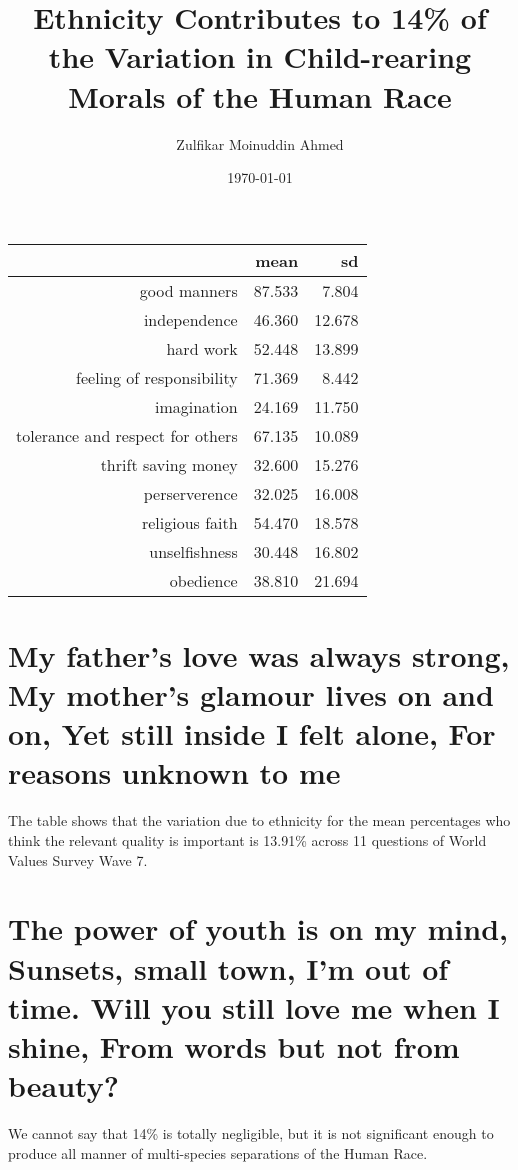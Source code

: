 \documentclass{amsart}
\title{Ethnicity Contributes to 14\% of the Variation in Child-rearing Morals of the Human Race}
\author{Zulfikar Moinuddin Ahmed}
\date{\today}
\begin{document}
\maketitle


\begin{table}[ht]
\centering
\begin{tabular}{rrr}
  \hline
 & mean & sd \\ 
  \hline
good manners & 87.533 & 7.804 \\ 
  independence & 46.360 & 12.678 \\ 
  hard work & 52.448 & 13.899 \\ 
  feeling of responsibility & 71.369 & 8.442 \\ 
  imagination & 24.169 & 11.750 \\ 
  tolerance and respect for others & 67.135 & 10.089 \\ 
  thrift saving money & 32.600 & 15.276 \\ 
  perserverence & 32.025 & 16.008 \\ 
  religious faith & 54.470 & 18.578 \\ 
  unselfishness & 30.448 & 16.802 \\ 
  obedience & 38.810 & 21.694 \\ 
   \hline
\end{tabular}
\end{table}

\section{My father's love was always strong,
My mother's glamour lives on and on,
Yet still inside I felt alone,
For reasons unknown to me}

The table shows that the variation due to ethnicity for the mean percentages who think the relevant quality is important is 13.91\% across 11 questions of World Values Survey Wave 7.

\section{The power of youth is on my mind,
Sunsets, small town, I'm out of time.
Will you still love me when I shine,
From words but not from beauty?}

We cannot say that 14\% is totally negligible, but it is not significant enough to produce all manner of multi-species separations of the Human Race.
\end{document}
